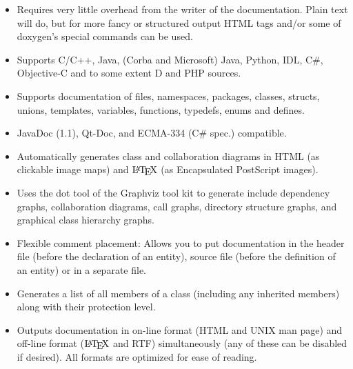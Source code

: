  \begin{itemize}
\item Requires very little overhead from the writer of the documentation. Plain text will do, but for more fancy or structured output HTML tags and/or some of doxygen's special commands can be used. \item Supports C/C++, Java, (Corba and Microsoft) Java, Python, IDL, C\#, Objective-C and to some extent D and PHP sources. \item Supports documentation of files, namespaces, packages, classes, structs, unions, templates, variables, functions, typedefs, enums and defines. \item JavaDoc (1.1), Qt-Doc, and ECMA-334 (C\# spec.) compatible. \item Automatically generates class and collaboration diagrams in HTML (as clickable image maps) and $\mbox{\LaTeX}$ (as Encapsulated PostScript images). \item Uses the dot tool of the Graphviz tool kit to generate include dependency graphs, collaboration diagrams, call graphs, directory structure graphs, and graphical class hierarchy graphs. \item Flexible comment placement: Allows you to put documentation in the header file (before the declaration of an entity), source file (before the definition of an entity) or in a separate file. \item Generates a list of all members of a class (including any inherited members) along with their protection level. \item Outputs documentation in on-line format (HTML and UNIX man page) and off-line format ($\mbox{\LaTeX}$ and RTF) simultaneously (any of these can be disabled if desired). All formats are optimized for ease of reading. \par

\end{itemize}
